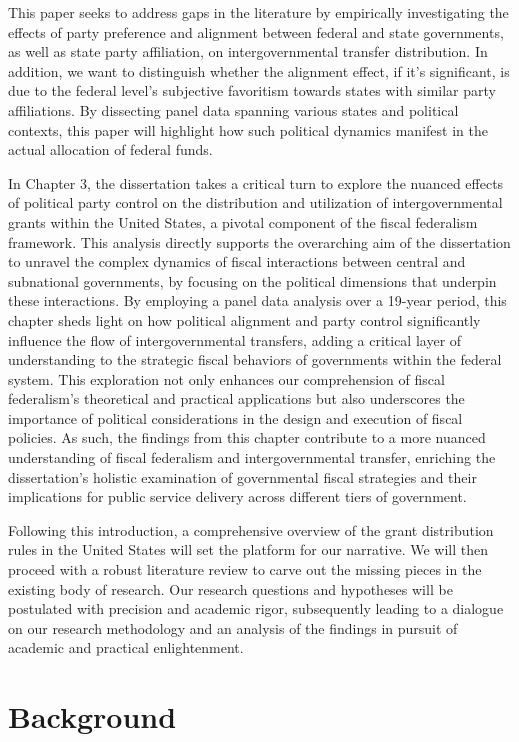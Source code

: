 This paper seeks to address gaps in the literature by empirically investigating the effects of party preference and alignment between federal and state governments, as well as state party affiliation, on intergovernmental transfer distribution. In addition, we want to distinguish whether the alignment effect, if it's significant, is due to the federal level's subjective favoritism towards states with similar party affiliations. By dissecting panel data spanning various states and political contexts, this paper will highlight how such political dynamics manifest in the actual allocation of federal funds.

In Chapter 3, the dissertation takes a critical turn to explore the nuanced effects of political party control on the distribution and utilization of intergovernmental grants within the United States, a pivotal component of the fiscal federalism framework. This analysis directly supports the overarching aim of the dissertation to unravel the complex dynamics of fiscal interactions between central and subnational governments, by focusing on the political dimensions that underpin these interactions. By employing a panel data analysis over a 19-year period, this chapter sheds light on how political alignment and party control significantly influence the flow of intergovernmental transfers, adding a critical layer of understanding to the strategic fiscal behaviors of governments within the federal system. This exploration not only enhances our comprehension of fiscal federalism's theoretical and practical applications but also underscores the importance of political considerations in the design and execution of fiscal policies. As such, the findings from this chapter contribute to a more nuanced understanding of fiscal federalism and intergovernmental transfer, enriching the dissertation's holistic examination of governmental fiscal strategies and their implications for public service delivery across different tiers of government.

Following this introduction, a comprehensive overview of the grant distribution rules in the United States will set the platform for our narrative. We will then proceed with a robust literature review to carve out the missing pieces in the existing body of research. Our research questions and hypotheses will be postulated with precision and academic rigor, subsequently leading to a dialogue on our research methodology and an analysis of the findings in pursuit of academic and practical enlightenment.


\section{Background}

